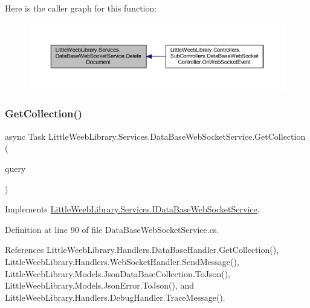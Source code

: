Here is the caller graph for this function\+:\nopagebreak
\begin{figure}[H]
\begin{center}
\leavevmode
\includegraphics[width=350pt]{class_little_weeb_library_1_1_services_1_1_data_base_web_socket_service_a5d9baf510f46f6a3fac9fe84325bb017_icgraph}
\end{center}
\end{figure}
\mbox{\label{class_little_weeb_library_1_1_services_1_1_data_base_web_socket_service_aef8bdd650778c72d639f1e89c1d6dcad}} 
\subsubsection{\texorpdfstring{Get\+Collection()}{GetCollection()}}
{\footnotesize\ttfamily async Task Little\+Weeb\+Library.\+Services.\+Data\+Base\+Web\+Socket\+Service.\+Get\+Collection (\begin{DoxyParamCaption}\item[{J\+Object}]{query }\end{DoxyParamCaption})}



Implements \mbox{\hyperlink{interface_little_weeb_library_1_1_services_1_1_i_data_base_web_socket_service_aeeeecbdfb73e0242a2d36f8d1d88b6ee}{Little\+Weeb\+Library.\+Services.\+I\+Data\+Base\+Web\+Socket\+Service}}.



Definition at line 90 of file Data\+Base\+Web\+Socket\+Service.\+cs.



References Little\+Weeb\+Library.\+Handlers.\+Data\+Base\+Handler.\+Get\+Collection(), Little\+Weeb\+Library.\+Handlers.\+Web\+Socket\+Handler.\+Send\+Message(), Little\+Weeb\+Library.\+Models.\+Json\+Data\+Base\+Collection.\+To\+Json(), Little\+Weeb\+Library.\+Models.\+Json\+Error.\+To\+Json(), and Little\+Weeb\+Library.\+Handlers.\+Debug\+Handler.\+Trace\+Message().



